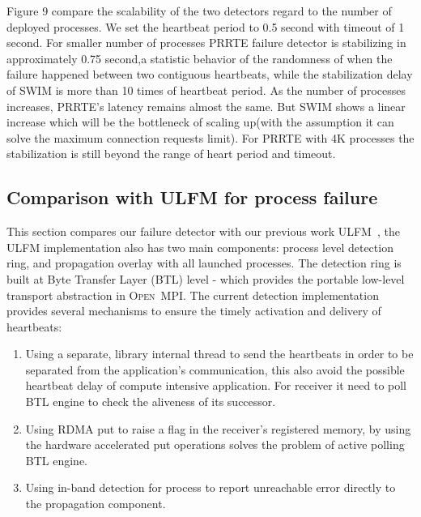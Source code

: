 \documentclass[sigconf]{acmart}
\newcommand{\prrte}[0]{\textsc{PRRTE}\xspace}
\newcommand{\ompi}[0]{\textsc{Open~MPI}\xspace}
\newcommand{\ulfm}[0]{\textsc{ULFM}\xspace}
\begin{document}
Figure 9 compare the scalability of the two detectors regard to the number of deployed processes. We set the heartbeat period to 0.5 second with timeout of 1 second. For smaller number of processes \prrte failure detector is stabilizing in approximately 0.75 second,a statistic behavior of the randomness of when the failure happened between two contiguous heartbeats, while the stabilization delay of SWIM is more than 10 times of heartbeat period. As the number of processes increases, \prrte's latency remains almost the same. But SWIM shows a linear increase which will be the bottleneck of scaling up(with the assumption it can solve the maximum connection requests limit). For \prrte with 4K processes the stabilization is still beyond the range of heart period and timeout.

\subsection{Comparison with \ulfm for process failure}
This section compares our failure detector with our previous work \ulfm~\cite{George16}, the \ulfm implementation also has two main components: process level detection ring, and propagation overlay with all launched processes. The detection ring is built at Byte Transfer Layer (BTL) level - which provides the portable low-level transport abstraction in \ompi. The current detection implementation provides several mechanisms to ensure the timely activation and delivery of heartbeats:
\begin{enumerate}
  \item Using a separate, library internal thread to send the heartbeats in order to be separated from the application's communication, this also avoid the possible heartbeat delay of compute intensive application. For receiver it need to poll BTL engine to check the aliveness of its successor. 
  \item Using RDMA put to raise a flag in the receiver's registered memory, by using the hardware accelerated put operations solves the problem of active polling BTL engine. 
  \item Using in-band detection for process to report unreachable error directly to the propagation component.
\end{enumerate}
\end{document}
